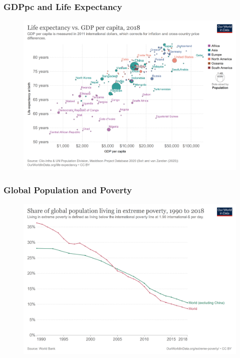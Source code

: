 \documentclass{beamer}
\begin{document}
\begin{frame} 
	\frametitle{\LARGE{GDPpc and Life Expectancy}}
	\begin{figure}[ht!]
		\centering
		\includegraphics[height=\textheight, keepaspectratio]{life-expectancy-vs-gdp-per-capita.png}
	\end{figure}
\end{frame}

\begin{frame} 
	\frametitle{\LARGE{Global Population and Poverty}}
	\begin{figure}[ht!]
		\centering
		\includegraphics[height=\textheight, keepaspectratio]{poverty-decline-without-china.png}
	\end{figure}
\end{frame}
\end{document}
